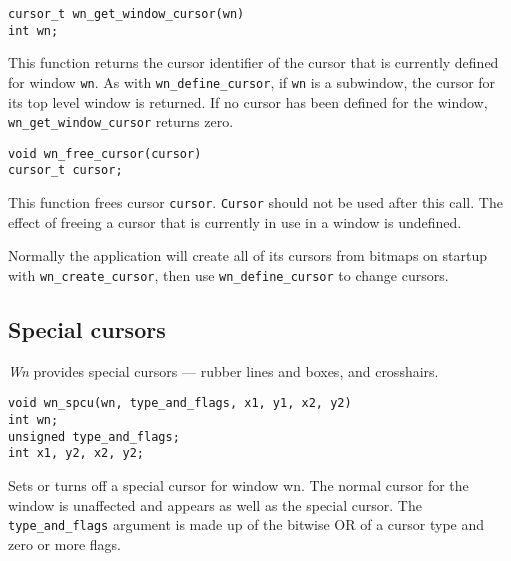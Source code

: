 \begin{verbatim}
cursor_t wn_get_window_cursor(wn)
int wn;
\end{verbatim}
This function returns the cursor identifier of the cursor that is
currently defined for window {\tt wn}.
As with {\tt wn\_define\_cursor}, if {\tt wn} is a subwindow, the
cursor for its top level window is returned.
If no cursor has been defined for the window, {\tt wn\_get\_window\_cursor}
returns zero.

\begin{verbatim}
void wn_free_cursor(cursor)
cursor_t cursor;
\end{verbatim}
This function frees cursor {\tt cursor}.  {\tt Cursor} should not be used
after this call.  The effect of freeing a cursor that is currently in
use in a window is undefined.

Normally the application will create all of its cursors from bitmaps on
startup with {\tt wn\_create\_cursor}, then use {\tt wn\_define\_cursor} to
change cursors.
\subsection{Special cursors}
\label{spcurs}
{\em Wn} provides special cursors --- rubber lines and boxes, and crosshairs.
\begin{verbatim}
void wn_spcu(wn, type_and_flags, x1, y1, x2, y2)
int wn;
unsigned type_and_flags;
int x1, y2, x2, y2;
\end{verbatim}
Sets or turns off a special cursor for window wn.
The normal cursor for the window is unaffected and appears as well
as the special cursor.
The {\tt type\_and\_flags} argument is made up of the bitwise OR of a
cursor type and zero or more flags.

